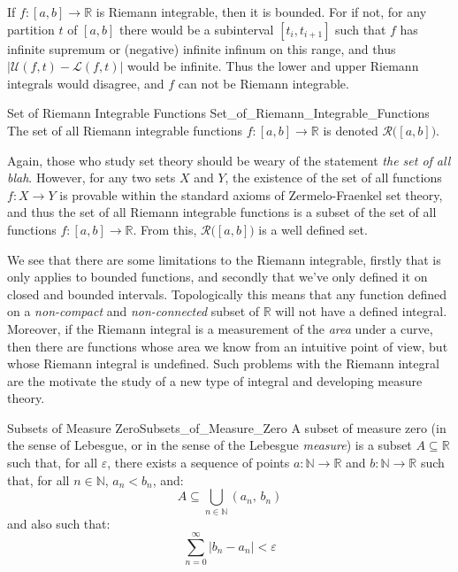 \documentclass[crop=false,class=article]{standalone}                           %
\begin{document}
        If $f:[a,b]\rightarrow\mathbb{R}$ is Riemann integrable, then it is
        bounded. For if not, for any partition $t$ of $[a,b]$ there would be a
        subinterval $[t_{i},t_{i+1}]$ such that $f$ has infinite supremum or
        (negative) infinite infinum on this range, and thus
        $|\mathcal{U}(f,t)-\mathcal{L}(f,t)|$ would be infinite. Thus the lower
        and upper Riemann integrals would disagree, and $f$ can not be Riemann
        integrable.
        \begin{fnotation}{Set of Riemann Integrable Functions}
                         {Set_of_Riemann_Integrable_Functions}
            The set of all Riemann integrable functions
            $f:[a,b]\rightarrow\mathbb{R}$ is denoted
            $\mathcal{R}\big([a,b]\big)$.
        \end{fnotation}
        Again, those who study set theory should be weary of the statement
        \textit{the set of all blah}. However, for any two sets $X$ and $Y$, the
        existence of the set of all functions $f:X\rightarrow{Y}$ is provable
        within the standard axioms of Zermelo-Fraenkel set theory, and thus the
        set of all Riemann integrable functions is a subset of the set of all
        functions $f:[a,b]\rightarrow\mathbb{R}$. From this,
        $\mathcal{R}\big([a,b]\big)$ is a well defined set.
        \par\hfill\par
        We see that there are some limitations to the Riemann integrable,
        firstly that is only applies to bounded functions, and secondly that
        we've only defined it on closed and bounded intervals. Topologically
        this means that any function defined on a \textit{non-compact} and
        \textit{non-connected} subset of $\mathbb{R}$ will not have a defined
        integral. Moreover, if the Riemann integral is a measurement of the
        \textit{area} under a curve, then there are functions whose area we know
        from an intuitive point of view, but whose Riemann integral is
        undefined. Such problems with the Riemann integral are the motivate the
        study of a new type of integral and developing measure theory.
        \begin{fdefinition}{Subsets of Measure Zero}{Subsets_of_Measure_Zero}
            A subset of measure zero (in the sense of Lebesgue, or in the sense
            of the Lebesgue \textit{measure}) is a subset $A\subseteq\mathbb{R}$
            such that, for all $\varepsilon$, there exists a sequence of points
            $a:\mathbb{N}\rightarrow\mathbb{R}$ and
            $b:\mathbb{N}\rightarrow\mathbb{R}$ such that, for all
            $n\in\mathbb{N}$, $a_{n}<b_{n}$, and:
            \begin{equation}
                A\subseteq\bigcup_{n\in\mathbb{N}}(a_{n},\,b_{n})
            \end{equation}
            and also such that:
            \begin{equation}
                \sum_{n=0}^{\infty}|b_{n}-a_{n}|<\varepsilon
            \end{equation}
        \end{fdefinition}
\end{document}
